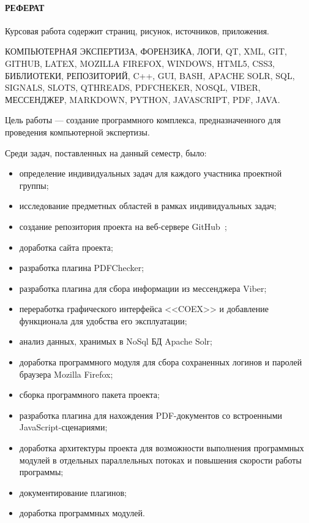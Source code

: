 \newpage
{}
\paragraph{\hfill РЕФЕРАТ \hfill}
Курсовая работа содержит  страниц,  рисунок,  источников,  приложения.

КОМПЬЮТЕРНАЯ ЭКСПЕРТИЗА, ФОРЕНЗИКА, ЛОГИ, QT, XML, GIT, GITHUB, LATEX, MOZILLA FIREFOX, WINDOWS, HTML5, CSS3, БИБЛИОТЕКИ, РЕПОЗИТОРИЙ, C++, GUI, BASH, APACHE SOLR, SQL, SIGNALS, SLOTS, QTHREADS, PDFCHEKER, NOSQL, VIBER, МЕССЕНДЖЕР, MARKDOWN, PYTHON, JAVASCRIPT, PDF, JAVA. 

Цель работы --- создание программного комплекса, предназначенного для проведения компьютерной экспертизы.

Среди задач, поставленных на данный семестр, было: 
\begin{itemize}
  \item определение индивидуальных задач для каждого участника проектной группы;
  \item исследование предметных областей в рамках индивидуальных задач; 
  \item создание репозитория проекта на веб-сервере GitHub~\cite{github};
  \item доработка сайта проекта;
  \item разработка плагина PDFChecker;
  \item разработка плагина для сбора информации из мессенджера Viber;
  \item переработка графического интерфейса <<COEX>> и добавление функционала для удобства его эксплуатации;
  \item анализ данных, хранимых в NoSql БД Apache Solr;
  \item доработка программного модуля для сбора сохраненных логинов и паролей браузера Mozilla Firefox;
  \item сборка программного пакета проекта;  
  \item разработка плагина для нахождения PDF-документов со встроенными JavaScript-сценариями;
  \item доработка архитектуры проекта для возможности выполнения программных модулей в отдельных параллельных потоках и повышения скорости работы программы;
  \item документирование плагинов;
  \item доработка программных модулей.
\end{itemize}

